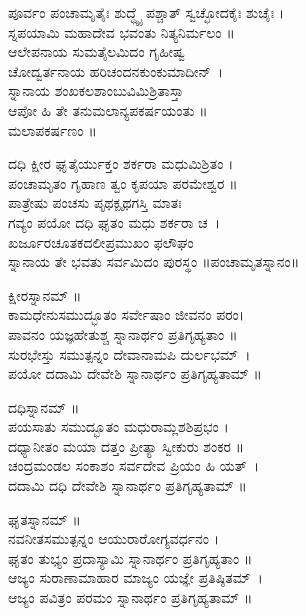 ಪೂರ್ವಂ ಪಂಚಾಮೃತೈಃ ಶುದ್ಧ್ಯೈ ಪಶ್ಚಾತ್ ಸ್ವಚ್ಛೋದಕೈಃ ಶುಚೈಃ ।\\
ಸ್ನಪಯಾಮಿ ಮಹಾದೇವ ಭವಂತು ನಿತ್ಯನಿರ್ಮಲಂ ॥\\
ಆಲೇಪನಾಯ ಸುಮತೈಲಮಿದಂ ಗೃಹೀಷ್ವ\\ ಚೋದ್ವರ್ತನಾಯ ಹರಿಚಂದನಕುಂಕುಮಾದೀನ್~।\\
ಸ್ನಾನಾಯ ಶಂಖಕಲಶಾಂಬುವಿಮಿಶ್ರಿತಾಸ್ತಾ\\ ಆಪೋ ಹಿ ತೇ ತನುಮಲಾನ್ಯಪಕರ್ಷಯಂತು ॥\\
 ಮಲಾಪಕರ್ಷಣಂ ॥

ದಧಿ ಕ್ಷೀರ ಘೃತೈರ್ಯುಕ್ತಂ ಶರ್ಕರಾ ಮಧುಮಿಶ್ರಿತಂ ।\\
ಪಂಚಾಮೃತಂ ಗೃಹಾಣ ತ್ವಂ ಕೃಪಯಾ ಪರಮೇಶ್ವರ  ॥\\
ಪಾತ್ರೇಷು ಪಂಚಸು ಪೃಥಕ್ಪೃಥಗಸ್ತಿ ಮಾತಃ\\ಗವ್ಯಂ ಪಯೋ ದಧಿ ಘೃತಂ ಮಧು ಶರ್ಕರಾ ಚ~।\\
ಖರ್ಜೂರಚೂತಕದಲೀಪ್ರಮುಖಂ ಫಲೌಘಂ\\ ಸ್ನಾನಾಯ ತೇ ಭವತು ಸರ್ವಮಿದಂ ಪುರಸ್ಥಂ ॥ಪಂಚಾಮೃತಸ್ನಾನಂ॥

ಕ್ಷೀರಸ್ನಾನಮ್ ॥\\
ಕಾಮಧೇನುಸಮುದ್ಭೂತಂ ಸರ್ವೇಷಾಂ ಜೀವನಂ ಪರಂ।\\
ಪಾವನಂ ಯಜ್ಞಹೇತುಶ್ಚ ಸ್ನಾನಾರ್ಥಂ ಪ್ರತಿಗೃಹ್ಯತಾಂ ॥ \\
ಸುರಭೇಸ್ತು ಸಮುತ್ಪನ್ನಂ ದೇವಾನಾಮಪಿ ದುರ್ಲಭಮ್~।\\ಪಯೋ ದದಾಮಿ ದೇವೇಶಿ ಸ್ನಾನಾರ್ಥಂ ಪ್ರತಿಗೃಹ್ಯತಾಮ್ ॥\\

ದಧಿಸ್ನಾನಮ್ ॥\\
ಪಯಸಾತು ಸಮುದ್ಭೂತಂ ಮಧುರಾಮ್ಲಶಶಿಪ್ರಭಂ ।\\
ದಧ್ಯಾನೀತಂ ಮಯಾ ದತ್ತಂ ಪ್ರೀತ್ಯಾ ಸ್ವೀಕುರು ಶಂಕರ ॥\\
ಚಂದ್ರಮಂಡಲ ಸಂಕಾಶಂ ಸರ್ವದೇವ ಪ್ರಿಯಂ ಹಿ ಯತ್~।\\ ದದಾಮಿ ದಧಿ ದೇವೇಶಿ ಸ್ನಾನಾರ್ಥಂ ಪ್ರತಿಗೃಹ್ಯತಾಮ್  ॥\\

ಘೃತಸ್ನಾನಮ್ ॥\\
ನವನೀತಸಮುತ್ಪನ್ನಂ ಆಯುರಾರೋಗ್ಯವರ್ಧನಂ ।\\
ಘೃತಂ ತುಭ್ಯಂ ಪ್ರದಾಸ್ಯಾಮಿ ಸ್ನಾನಾರ್ಥಂ ಪ್ರತಿಗೃಹ್ಯತಾಂ ॥\\
ಆಜ್ಯಂ ಸುರಾಣಾಮಾಹಾರ ಮಾಜ್ಯಂ ಯಜ್ಞೇ ಪ್ರತಿಷ್ಠಿತಮ್~। \\ ಆಜ್ಯಂ ಪವಿತ್ರಂ ಪರಮಂ ಸ್ನಾನಾರ್ಥಂ ಪ್ರತಿಗೃಹ್ಯತಾಮ್ ॥\\

